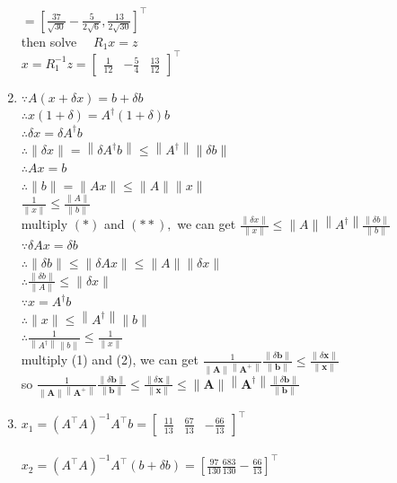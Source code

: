 \documentclass[english,onecolumn]{IEEEtran}
\begin{document}
\begin{enumerate}
$=\left[\frac{37}{\sqrt{30}}-\frac{5}{2 \sqrt{6}}, \frac{13}{2 \sqrt{30}}\right]^{\top}$\\
then solve $\quad R_{1} x=z$\\
$x=R_{1}^{-1} z=\left[\begin{array}{ccc}\frac{1}{12} & -\frac{5}{4} & \frac{13}{12}\end{array}\right]^{\top}$

\item 
$\because A(x+\delta x)=b+\delta b$\\
$\therefore x(1+\delta)=A^{\dagger}(1+\delta) b$\\
$\therefore \delta x=\delta A^{\dagger} b$\\
$\therefore\|\delta x\|=\left\|\delta A^{\dagger} b\right\| \leqslant\left\|A^{\dagger}\right\|\|\delta b\|$\\
$\therefore A x=b$\\
$\therefore \|b\|=\| A x\|\leqslant\| A\|\| x \|$\\
$\frac{1}{\|x\|} \leqslant \frac{\|A\|}{\|b\|}$\\
multiply $(*)$ and $(* *),$ we can get
$\frac{\|\delta x\|}{\|x\|} \leqslant\|A\|\left\|A^{\dagger}\right\| \frac{\|\delta b\|}{\|b\|}$\\
$\because \delta A x=\delta b$\\
$\therefore\|\delta b\| \leqslant\|\delta A x\| \leqslant\|A\|\|\delta x\|$\\
$\therefore \frac{\|\delta b\|}{\|A\|} \leqslant\|\delta x\|$\\
$\because x=A^{\dagger} b$\\
$\therefore\|x\| \leqslant\left\|A^{\dagger}\right\|\|b\|$\\
$\therefore \frac{1}{\left\|A^{\dagger}\right\|\|b\|} \leqslant \frac{1}{\|x\|}$\\
multiply (1) and (2), we can get
$\frac{1}{\|\mathbf{A}\|\left\|\mathbf{A}^{+}\right\|} \frac{\|\delta \mathbf{b}\|}{\|\mathbf{b}\|} \leqslant \frac{\|\delta \mathbf{x}\|}{\|\mathbf{x}\|}$\\
so $\frac{1}{\|\mathbf{A}\|\left\|\mathbf{A}^{+}\right\|} \frac{\|\delta \mathbf{b}\|}{\|\mathbf{b}\|} \leq \frac{\|\delta \mathbf{x}\|}{\|\mathbf{x}\|} \leq\|\mathbf{A}\|\left\|\mathbf{A}^{\dagger}\right\| \frac{\|\delta \mathbf{b}\|}{\|\mathbf{b}\|}$\\

\item
$x_{1}=\left(A^{\top} A\right)^{-1} A^{\top} b=\left[\begin{array}{lll}\frac{11}{13} & \frac{67}{13} & -\frac{66}{13}\end{array}\right]^{\top}$\\\\
$x_{2}=\left(A^{\top} A\right)^{-1} A^{\top}(b+\delta b)=\left[\frac{97}{130} \frac{683}{130}-\frac{66}{13}\right]^{\top}$\\


\end{enumerate}
\end{document}
